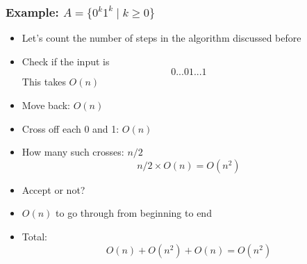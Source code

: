 \begin{frame}[allowframebreaks] \frametitle{Example: $A=\{0^k 1^k\mid k \geq 0\}$}
\begin{itemize}
\item Let's count the number of steps in the algorithm
  discussed before
  
\item Check if the input is
  \begin{equation*}
0...0 1...1
\end{equation*}
This takes $O(n)$
\item Move back: $O(n)$
\item Cross off each 0 and 1: $O(n)$

\item [] How many such crosses: $n/2$
  \begin{equation*}
n/2 \times O(n) = O(n^2)
\end{equation*}
\item Accept or not?

\item [] $O(n)$ to go through from beginning to end
\item Total:
  \begin{equation*}
O(n) + O(n^2) +O(n) = O(n^2)
\end{equation*}
\end{itemize}\end{frame}

